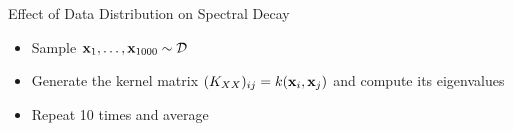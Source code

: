 \documentclass{beamer}
\begin{document}

\begin{frame}{Effect of Data Distribution on Spectral Decay}
\begin{itemize}[<+->]
    \item Sample $\boldsymbol{\mathbf{x}}_1, \ldots, \boldsymbol{\mathbf{x}}_{1000} \sim \mathcal D$
    \item Generate the kernel matrix $(K_{XX})_{ij} = k(\boldsymbol{\mathbf{x}}_i, \boldsymbol{\mathbf{x}}_j)$ and compute its eigenvalues
    \item Repeat 10 times and average
\end{itemize}    
\end{frame}
\end{document}
